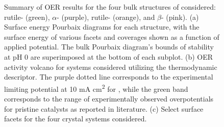 \begin{figure}
\centering
{}
\caption{\label{fig:oer_volcano}
Summary of OER results for the four bulk structures of \IrOx considered: rutile- (green), $\alpha$- (purple), rutile- (orange), and $\beta$- (pink).
%
(a) Surface energy Pourbaix diagrams for each structure, with the surface energy of various facets and coverages shown as a function of applied potential.
The bulk Pourbaix diagram's bounds of stability at pH 0 are superimposed at the bottom of each subplot.
%
(b) OER activity volcano for \IrOx systems considered utilizing the \DGOmOH thermodynamic descriptor.
The purple dotted line corresponds to the experimental limiting potential at 10 mA cm\textsuperscript{2} for  \cite{Seitz2016}, %
while the green band corresponds to the range of experimentally observed overpotentials for pristine  catalysts as reported in literature.  %
%
(c) Select surface facets for the four \IrOx crystal systems considered.
%
}
\end{figure}

